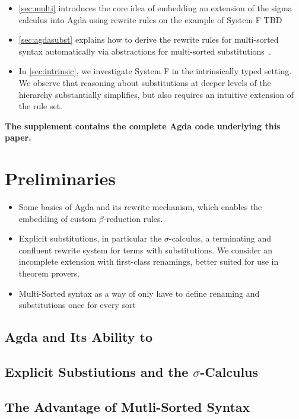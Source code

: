 \documentclass[screen,nonacm]{acmart}
\begin{document}
\begin{itemize}
  \item \cref{sec:multi} introduces the core idea of embedding an extension of the sigma
        calculus into Agda using rewrite rules on the example of System F TBD
  \item \cref{sec:agdasubst} explains how to derive the rewrite rules for multi-sorted
        syntax automatically via abstractions for multi-sorted substitutions~\cite{saffrich:LIPIcs.ITP.2024.32}.
  \item In \cref{sec:intrinsic}, we investigate System F in the intrinsically typed
        setting. We observe that reasoning about substitutions at deeper levels of the
        hierarchy substantially simplifies, but also requires an intuitive
        extension of the rule set.
\end{itemize}

\textbf{The supplement contains the complete Agda code underlying this paper.}

\section{Preliminaries}\label{sec:preliminaries}

\begin{itemize}
  \item Some basics of Agda and its rewrite mechanism, which enables the embedding of
        custom $\beta$-reduction rules.
  \item Explicit substitutions, in particular the $\sigma$-calculus, a terminating and
        confluent rewrite system for terms with substitutions. We consider an
        incomplete extension with first-class renamings, better suited for use in
        theorem provers.
  \item Multi-Sorted syntax as a way of only have to define renaming and substitutions
        once for every sort
\end{itemize}

\subsection{Agda and Its Ability to }

\subsection{Explicit Substiutions and the $\sigma$-Calculus}

\subsection{The Advantage of Mutli-Sorted Syntax}
\end{document}
